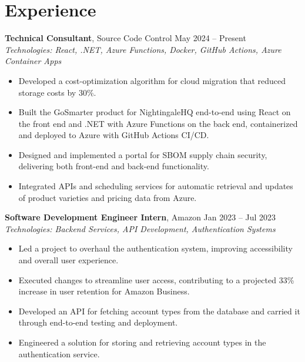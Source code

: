 \documentclass[11pt,a4paper]{article}
\begin{document}
\section{Experience}
\textbf{Technical Consultant}, Source Code Control \hfill May 2024 -- Present
\\ \textit{Technologies: React, .NET, Azure Functions, Docker, GitHub Actions, Azure Container Apps}
\begin{itemize}
  \item Developed a cost-optimization algorithm for cloud migration that reduced storage costs by 30\%.
  \item Built the GoSmarter product for NightingaleHQ end-to-end using React on the front end and .NET with Azure Functions on the back end, containerized and deployed to Azure with GitHub Actions CI/CD.
  \item Designed and implemented a portal for SBOM supply chain security, delivering both front-end and back-end functionality.
  \item Integrated APIs and scheduling services for automatic retrieval and updates of product varieties and pricing data from Azure.
\end{itemize}
\vspace{2pt}
\textbf{Software Development Engineer Intern}, Amazon \hfill Jan 2023 -- Jul 2023
\\ \textit{Technologies: Backend Services, API Development, Authentication Systems}
\begin{itemize}
  \item Led a project to overhaul the authentication system, improving accessibility and overall user experience.
  \item Executed changes to streamline user access, contributing to a projected 33\% increase in user retention for Amazon Business.
  \item Developed an API for fetching account types from the database and carried it through end-to-end testing and deployment.
  \item Engineered a solution for storing and retrieving account types in the authentication service.
\end{itemize}
\vspace{2pt}
\end{document}
